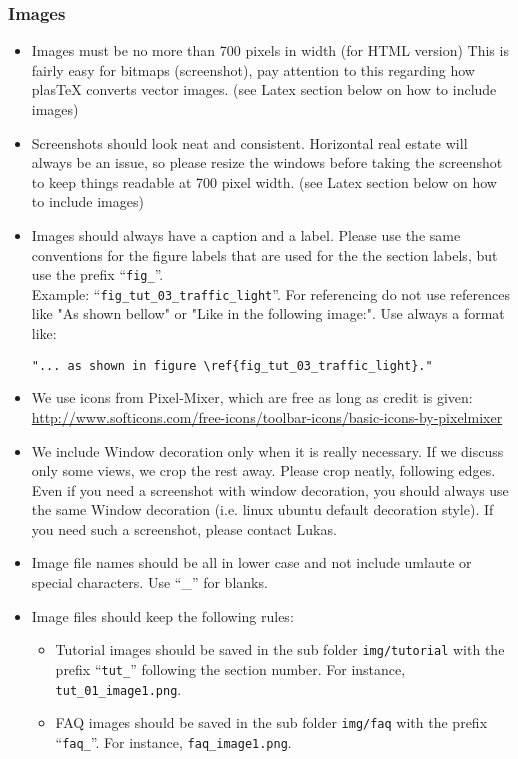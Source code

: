 \subsubsection{Images}
\begin{itemize}
	\item Images must be no more than 700 pixels in width (for HTML version)  This is fairly easy for bitmaps (screenshot), pay attention to this regarding how plasTeX converts vector images. (see Latex section below on how to include images)

	\item Screenshots should look neat and consistent.  Horizontal real estate will always be an issue, so please resize the windows before taking the screenshot to keep things readable at 700 pixel width.  (see Latex section below on how to include images)

	\item Images should always have a caption and a label. Please use the same conventions for the figure labels that are used for the the section labels, but use the prefix ``\texttt{fig\_}''. \\Example: ``\texttt{fig\_tut\_03\_traffic\_light}''. For referencing do not use references like "As shown bellow" or "Like in the following image:". Use always a format like:

\begin{verbatim}"... as shown in figure \ref{fig_tut_03_traffic_light}."\end{verbatim}

	\item We use icons from Pixel-Mixer, which are free as long as credit is given: \url{http://www.softicons.com/free-icons/toolbar-icons/basic-icons-by-pixelmixer}

  \item We include Window decoration only when it is really necessary.  If we discuss only some views, we crop the rest away.  Please crop neatly, following edges. Even if you need a screenshot with window decoration, you should always use the same Window decoration (i.e. linux ubuntu default decoration style). If you need such a screenshot, please contact Lukas.

  \item Image file names should be all in lower case and not include umlaute or special characters. Use ``\_'' for blanks.

  \item Image files should keep the following rules:
	
\begin{itemize}
		\item Tutorial images should be saved in the sub folder \texttt{img/tutorial} with the prefix ``\texttt{tut\_}'' following the section number. For instance, \texttt{tut\_01\_image1.png}.

		\item FAQ images should be saved in the sub folder \texttt{img/faq} with the prefix ``\texttt{faq\_}''. For instance, \texttt{faq\_image1.png}.

	\end{itemize} 
	\end{itemize}

